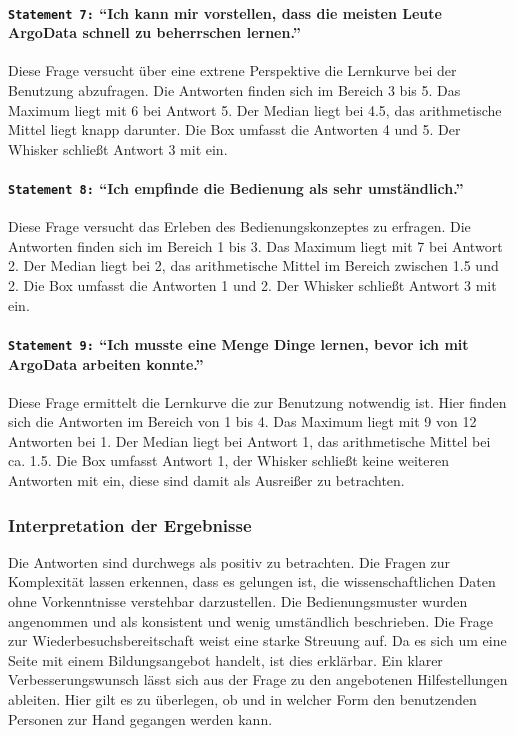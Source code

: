 \paragraph{\texttt{Statement 7:} "`Ich kann mir vorstellen, dass die meisten Leute ArgoData schnell zu beherrschen lernen."'}
    Diese Frage versucht über eine extrene Perspektive die Lernkurve bei der Benutzung abzufragen. Die Antworten finden sich im Bereich 3 bis 5. Das Maximum liegt mit 6 bei Antwort 5. Der Median liegt bei 4.5, das arithmetische Mittel liegt knapp darunter. Die Box umfasst die Antworten 4 und 5. Der Whisker schließt Antwort 3 mit ein.

\paragraph{\texttt{Statement 8:} "`Ich empfinde die Bedienung als sehr umständlich."'}
    Diese Frage versucht das Erleben des Bedienungskonzeptes zu erfragen. Die Antworten finden sich im Bereich 1 bis 3. Das Maximum liegt mit 7 bei Antwort 2. Der Median liegt bei 2, das arithmetische Mittel im Bereich zwischen 1.5 und 2. Die Box umfasst die Antworten 1 und 2. Der Whisker schließt Antwort 3 mit ein.

\paragraph{\texttt{Statement 9:} "`Ich musste eine Menge Dinge lernen, bevor ich mit ArgoData arbeiten konnte."'}
    Diese Frage ermittelt die Lernkurve die zur Benutzung notwendig ist. Hier finden sich die Antworten im Bereich von 1 bis 4. Das Maximum liegt mit 9 von 12 Antworten bei 1. Der Median liegt bei Antwort 1, das arithmetische Mittel bei ca. 1.5. Die Box umfasst Antwort 1, der Whisker schließt keine weiteren Antworten mit ein, diese sind damit als Ausreißer zu betrachten.

\subsubsection{Interpretation der Ergebnisse}
Die Antworten sind durchwegs als positiv zu betrachten. Die Fragen zur Komplexität lassen erkennen, dass es gelungen ist, die wissenschaftlichen Daten ohne Vorkenntnisse verstehbar darzustellen. Die Bedienungsmuster wurden angenommen und als konsistent und wenig umständlich beschrieben. Die Frage zur Wiederbesuchsbereitschaft weist eine starke Streuung auf. Da es sich um eine Seite mit einem Bildungsangebot handelt, ist dies erklärbar.
Ein klarer Verbesserungswunsch lässt sich aus der Frage zu den angebotenen Hilfestellungen ableiten. Hier gilt es  zu überlegen, ob und in welcher Form den benutzenden Personen zur Hand gegangen werden kann.



